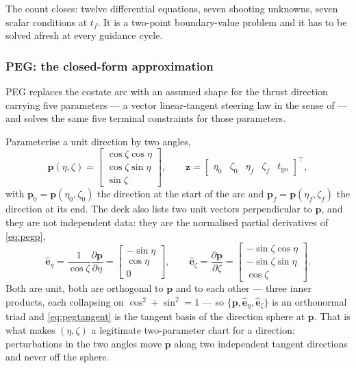 \documentclass[11pt]{article}
\begin{document}
The count closes: twelve differential equations, seven shooting unknowns, seven
scalar conditions at $t_f$. It is a two-point boundary-value problem and it has
to be solved afresh at every guidance cycle.

\subsubsection{PEG: the closed-form approximation}
\label{sec:peg}

PEG replaces the costate arc with an assumed shape for the thrust direction
carrying five parameters --- a vector linear-tangent steering law in the sense
of \cite{Jaggers1977} --- and solves the same five terminal constraints for
those parameters.

Parameterise a unit direction by two angles,
\begin{equation}
  \mathbf{p}(\eta,\zeta) =
  \begin{bmatrix}\cos\zeta\cos\eta\\ \cos\zeta\sin\eta\\ \sin\zeta\end{bmatrix},
  \qquad
  \mathbf{z} = \begin{bmatrix}\eta_0 & \zeta_0 & \eta_f & \zeta_f &
                              t_{\text{go}}\end{bmatrix}^{\!\top},
  \label{eq:pegp}
\end{equation}
with $\mathbf{p}_0 = \mathbf{p}(\eta_0,\zeta_0)$ the direction at the start of
the arc and $\mathbf{p}_f = \mathbf{p}(\eta_f,\zeta_f)$ the direction at its
end. The deck also lists two unit vectors perpendicular to $\mathbf{p}$, and
they are not independent data: they are the normalised partial derivatives of
\eqref{eq:pegp},
\begin{equation}
  \hat{\mathbf{e}}_\eta = \frac{1}{\cos\zeta}\frac{\partial\mathbf{p}}{\partial\eta}
    = \begin{bmatrix}-\sin\eta\\ \cos\eta\\ 0\end{bmatrix},
  \qquad
  \hat{\mathbf{e}}_\zeta = \frac{\partial\mathbf{p}}{\partial\zeta}
    = \begin{bmatrix}-\sin\zeta\cos\eta\\ -\sin\zeta\sin\eta\\
                     \cos\zeta\end{bmatrix} .
  \label{eq:pegtangent}
\end{equation}
Both are unit, both are orthogonal to $\mathbf{p}$ and to each other --- three
inner products, each collapsing on $\cos^2+\sin^2 = 1$ --- so
$\{\mathbf{p},\hat{\mathbf{e}}_\eta,\hat{\mathbf{e}}_\zeta\}$ is an orthonormal
triad and \eqref{eq:pegtangent} is the tangent basis of the direction sphere at
$\mathbf{p}$. That is what makes $(\eta,\zeta)$ a legitimate two-parameter
chart for a direction: perturbations in the two angles move $\mathbf{p}$ along
two independent tangent directions and never off the sphere.
\end{document}
